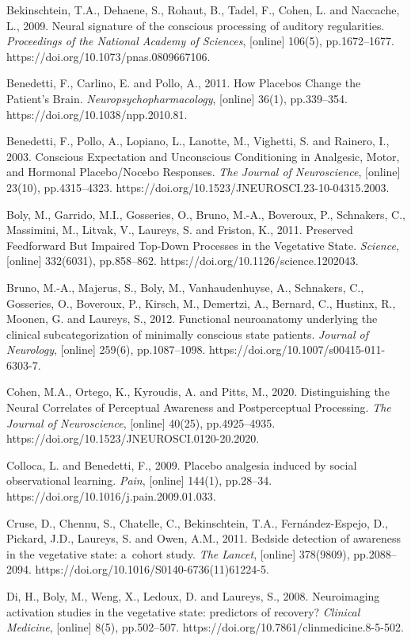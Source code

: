 Bekinschtein, T.A., Dehaene, S., Rohaut, B., Tadel, F., Cohen, L. and Naccache, L., 2009. Neural signature of the conscious processing of auditory regularities. \textit{Proceedings of the National Academy of Sciences}, [online] 106(5), pp.1672–1677. https://doi.org/10.1073/pnas.0809667106.

Benedetti, F., Carlino, E. and Pollo, A., 2011. How Placebos Change the Patient's Brain. \textit{Neuropsychopharmacology}, [online] 36(1), pp.339–354. https://doi.org/10.1038/npp.2010.81.

Benedetti, F., Pollo, A., Lopiano, L., Lanotte, M., Vighetti, S. and Rainero, I., 2003. Conscious Expectation and Unconscious Conditioning in Analgesic, Motor, and Hormonal Placebo/Nocebo Responses. \textit{The Journal of Neuroscience}, [online] 23(10), pp.4315–4323. https://doi.org/10.1523/JNEUROSCI.23-10-04315.2003.

Boly, M., Garrido, M.I., Gosseries, O., Bruno, M.-A., Boveroux, P., Schnakers, C., Massimini, M., Litvak, V., Laureys, S. and Friston, K., 2011. Preserved Feedforward But Impaired Top-Down Processes in the Vegetative State. \textit{Science}, [online] 332(6031), pp.858–862. https://doi.org/10.1126/science.1202043.

Bruno, M.-A., Majerus, S., Boly, M., Vanhaudenhuyse, A., Schnakers, C., Gosseries, O., Boveroux, P., Kirsch, M., Demertzi, A., Bernard, C., Hustinx, R., Moonen, G. and Laureys, S., 2012. Functional neuroanatomy underlying the clinical subcategorization of minimally conscious state patients. \textit{Journal of Neurology}, [online] 259(6), pp.1087–1098. https://doi.org/10.1007/s00415-011-6303-7.

Cohen, M.A., Ortego, K., Kyroudis, A. and Pitts, M., 2020. Distinguishing the Neural Correlates of Perceptual Awareness and Postperceptual Processing. \textit{The Journal of Neuroscience}, [online] 40(25), pp.4925–4935. https://doi.org/10.1523/JNEUROSCI.0120-20.2020.

Colloca, L. and Benedetti, F., 2009. Placebo analgesia induced by social observational learning. \textit{Pain}, [online] 144(1), pp.28–34. https://doi.org/10.1016/j.pain.2009.01.033.

Cruse, D., Chennu, S., Chatelle, C., Bekinschtein, T.A., Fernández-Espejo, D., Pickard, J.D., Laureys, S. and Owen, A.M., 2011. Bedside detection of awareness in the vegetative state: a~cohort study. \textit{The Lancet}, [online] 378(9809), pp.2088–2094. https://doi.org/10.1016/S0140-6736(11)61224-5.

Di, H., Boly, M., Weng, X., Ledoux, D. and Laureys, S., 2008. Neuroimaging activation studies in the vegetative state: predictors of recovery? \textit{Clinical Medicine}, [online] 8(5), pp.502–507. https://doi.org/10.7861/clinmedicine.8-5-502.

